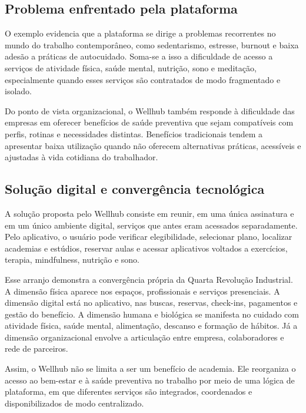 \documentclass[12pt,a4paper]{article}
\begin{document}
\subsection{Problema enfrentado pela plataforma}
\label{sec:org07d1deb}

O exemplo evidencia que a plataforma se dirige a problemas recorrentes no mundo do trabalho contemporâneo, como sedentarismo, estresse, burnout e baixa adesão a práticas de autocuidado. Soma-se a isso a dificuldade de acesso a serviços de atividade física, saúde mental, nutrição, sono e meditação, especialmente quando esses serviços são contratados de modo fragmentado e isolado.

Do ponto de vista organizacional, o Wellhub também responde à dificuldade das empresas em oferecer benefícios de saúde preventiva que sejam compatíveis com perfis, rotinas e necessidades distintas. Benefícios tradicionais tendem a apresentar baixa utilização quando não oferecem alternativas práticas, acessíveis e ajustadas à vida cotidiana do trabalhador.

\subsection{Solução digital e convergência tecnológica}
\label{sec:org3f31bf1}

A solução proposta pelo Wellhub consiste em reunir, em uma única assinatura e em um único ambiente digital, serviços que antes eram acessados separadamente. Pelo aplicativo, o usuário pode verificar elegibilidade, selecionar plano, localizar academias e estúdios, reservar aulas e acessar aplicativos voltados a exercícios, terapia, mindfulness, nutrição e sono.

Esse arranjo demonstra a convergência própria da Quarta Revolução Industrial. A dimensão física aparece nos espaços, profissionais e serviços presenciais. A dimensão digital está no aplicativo, nas buscas, reservas, check-ins, pagamentos e gestão do benefício. A dimensão humana e biológica se manifesta no cuidado com atividade física, saúde mental, alimentação, descanso e formação de hábitos. Já a dimensão organizacional envolve a articulação entre empresa, colaboradores e rede de parceiros.

Assim, o Wellhub não se limita a ser um benefício de academia. Ele reorganiza o acesso ao bem-estar e à saúde preventiva no trabalho por meio de uma lógica de plataforma, em que diferentes serviços são integrados, coordenados e disponibilizados de modo centralizado.
\end{document}

